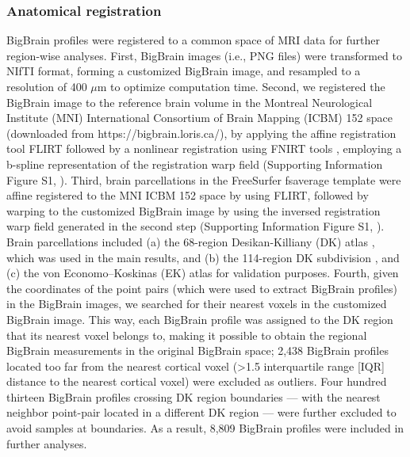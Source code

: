 \begin{refsection}
\subsubsection*{Anatomical registration}
BigBrain profiles were registered to a common space of MRI data for further region-wise analyses. First, BigBrain images (i.e., PNG files) were transformed to NIfTI format, forming a customized BigBrain image, and resampled to a resolution of 400 $\mu$m to optimize computation time. Second, we registered the BigBrain image to the reference brain volume in the Montreal Neurological Institute (MNI) International Consortium of Brain Mapping (ICBM) 152 space (downloaded from https://bigbrain.loris.ca/), by applying the affine registration tool FLIRT \citep{JENKINSON2001143,JENKINSON2002825} followed by a nonlinear registration using FNIRT tools \citep{Andersson2007NonlinearOF}, employing a b-spline representation of the registration warp field (Supporting Information Figure S1, \citet{WEI2019bigbrain}). Third, brain parcellations in the FreeSurfer fsaverage template were affine registered to the MNI ICBM 152 space by using FLIRT, followed by warping to the customized BigBrain image by using the inversed registration warp field generated in the second step (Supporting Information Figure S1, \citep{WEI2019bigbrain}). Brain parcellations included (a) the 68-region Desikan-Killiany (DK) atlas \citep{DESIKAN2006968,Fischl2004parcellation}, which was used in the main results, and (b) the 114-region DK subdivision \citep{CAMMOUN2012386}, and (c) the von Economo–Koskinas (EK) atlas \citep{Scholtens2015ECONOMO,SCHOLTENS2018ECONOMO,von1925cytoarchitektonik} for validation purposes. Fourth, given the coordinates of the point pairs (which were used to extract BigBrain profiles) in the BigBrain images, we searched for their nearest voxels in the customized BigBrain image. This way, each BigBrain profile was assigned to the DK region that its nearest voxel belongs to, making it possible to obtain the regional BigBrain measurements in the original BigBrain space; 2,438 BigBrain profiles located too far from the nearest cortical voxel (>1.5 interquartile range [IQR] distance to the nearest cortical voxel) were excluded as outliers. Four hundred thirteen BigBrain profiles crossing DK region boundaries — with the nearest neighbor point-pair located in a different DK region — were further excluded to avoid samples at boundaries. As a result, 8,809 BigBrain profiles were included in further analyses.


\end{refsection}
